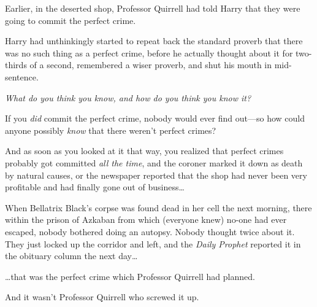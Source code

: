 \later

Earlier, in the deserted shop, Professor Quirrell had told Harry that they were going to commit the perfect crime.

Harry had unthinkingly started to repeat back the standard proverb that there was no such thing as a perfect crime, before he actually thought about it for two-thirds of a second, remembered a wiser proverb, and shut his mouth in mid-sentence.

\emph{What do you think you know, and how do you think you know it?}

If you \emph{did} commit the perfect crime, nobody would ever find out—so how could anyone possibly \emph{know} that there weren't perfect crimes?

And as soon as you looked at it that way, you realized that perfect crimes probably got committed \emph{all the time}, and the coroner marked it down as death by natural causes, or the newspaper reported that the shop had never been very profitable and had finally gone out of business…

When Bellatrix Black's corpse was found dead in her cell the next morning, there within the prison of Azkaban from which (everyone knew) no-one had ever escaped, nobody bothered doing an autopsy. Nobody thought twice about it. They just locked up the corridor and left, and the \emph{Daily Prophet} reported it in the obituary column the next day…

…that was the perfect crime which Professor Quirrell had planned.

And it wasn't Professor Quirrell who screwed it up.
